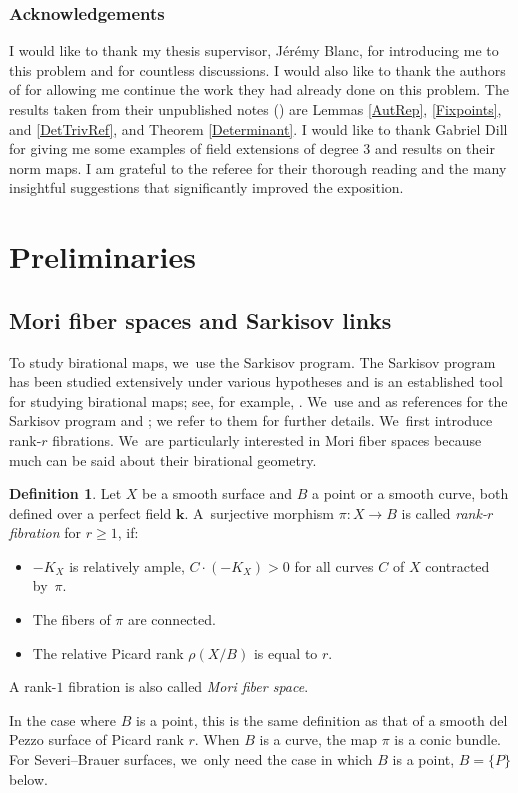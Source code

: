\documentclass[JEP,XML,SOM,Unicode,NoFloatCountersInSection, NoEqCountersInSection,published]{cedram}
\theoremstyle{definition}
\newtheorem{definition}[theorem]{Definition}
\newcommand{\kk}{{\boldsymbol{k}}}
\begin{document}
\subsubsection*{Acknowledgements}
I would like to thank my thesis supervisor, Jérémy Blanc, for introducing me to this problem and for countless discussions. I would also like to thank the authors of \cite{BSY} for allowing me continue the work they had already done on this problem. The results taken from their unpublished notes (\cite{BSYUnp}) are Lemmas \ref{AutRep}, \ref{Fixpoints}, and \ref{DetTrivRef}, and Theorem \ref{Determinant}. I would like to thank Gabriel Dill for giving me some examples of field extensions of degree $3$ and results on their norm maps. I am grateful to the referee for their thorough reading and the many insightful suggestions that significantly improved the exposition.

\section{Preliminaries}

\subsection{Mori fiber spaces and Sarkisov links} \label{SubMori}
To study birational maps, we~use the Sarkisov program. The Sarkisov program has been studied extensively under various hypotheses and is an established tool for studying birational maps; see, for example, \cite{BSY}. We~use \cite{Lamy_2020} and \cite{Iskovskikh} as references for the Sarkisov program \cite{Lamy_2020} and \cite{Iskovskikh}; we refer to them for further details. We~first introduce rank-$r$ fibrations. We~are particularly interested in Mori fiber spaces because much can be said about their birational geometry.

\begin{definition} \label{RankRFibration}
Let $X$ be a smooth surface and $B$ a point or a smooth curve, both defined over a perfect field $\kk$. A~surjective morphism $\pi\colon X \to B$ is called \emph{rank-$r$ fibration} for $r \geq 1$, if:
\begin{itemize}
\item $-K_X$ is relatively ample, \ie $C\!\cdot\! (-K_X) \!>\! 0$ for all curves $C$ of $X$ contracted by~$\pi$.
\item The fibers of $\pi$ are connected.
\item The relative Picard rank $\rho(X/B)$ is equal to $r$.
\end{itemize}
A rank-$1$ fibration is also called \emph{Mori fiber space}.
\end{definition}
In the case where $B$ is a point, this is the same definition as that of a smooth del Pezzo surface of Picard rank $r$. When $B$ is a curve, the map $\pi$ is a conic bundle. For Severi--Brauer surfaces, we~only need the case in which $B$ is a point, $B = \{P\}$ below.
\end{document}
